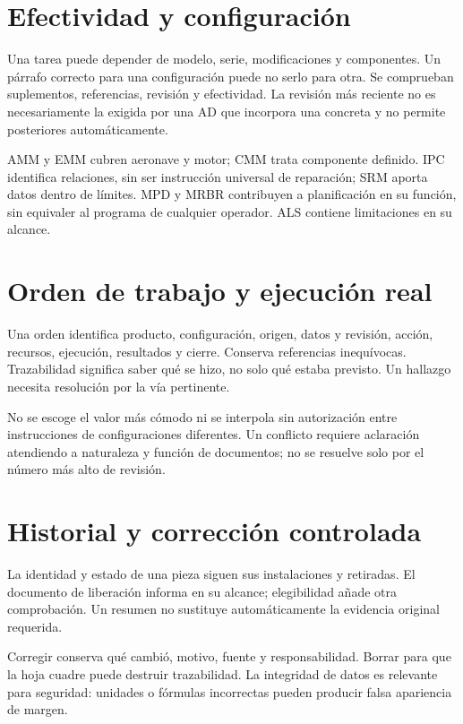 
\section{Efectividad y configuración}
Una tarea puede depender de modelo, serie, modificaciones y componentes. Un párrafo correcto para una configuración puede no serlo para otra. Se comprueban suplementos, referencias, revisión y efectividad. La revisión más reciente no es necesariamente la exigida por una AD que incorpora una concreta y no permite posteriores automáticamente.

AMM y EMM cubren aeronave y motor; CMM trata componente definido. IPC identifica relaciones, sin ser instrucción universal de reparación; SRM aporta datos dentro de límites. MPD y MRBR contribuyen a planificación en su función, sin equivaler al programa de cualquier operador. ALS contiene limitaciones en su alcance.
\section{Orden de trabajo y ejecución real}
Una orden identifica producto, configuración, origen, datos y revisión, acción, recursos, ejecución, resultados y cierre. Conserva referencias inequívocas. Trazabilidad significa saber qué se hizo, no solo qué estaba previsto. Un hallazgo necesita resolución por la vía pertinente.

No se escoge el valor más cómodo ni se interpola sin autorización entre instrucciones de configuraciones diferentes. Un conflicto requiere aclaración atendiendo a naturaleza y función de documentos; no se resuelve solo por el número más alto de revisión.
\section{Historial y corrección controlada}
La identidad y estado de una pieza siguen sus instalaciones y retiradas. El documento de liberación informa en su alcance; elegibilidad añade otra comprobación. Un resumen no sustituye automáticamente la evidencia original requerida.

Corregir conserva qué cambió, motivo, fuente y responsabilidad. Borrar para que la hoja cuadre puede destruir trazabilidad. La integridad de datos es relevante para seguridad: unidades o fórmulas incorrectas pueden producir falsa apariencia de margen.
